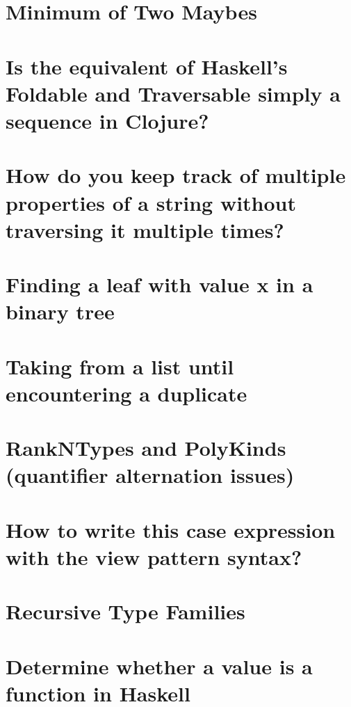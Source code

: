 \documentclass{book}%
\begin{document}
\section{Minimum of Two Maybes}


\section{Is the equivalent of Haskell's Foldable and Traversable simply a sequence in Clojure?}


\section{How do you keep track of multiple properties of a string without traversing it multiple times?}


\section{Finding a leaf with value x in a binary tree}


\section{Taking from a list until encountering a duplicate}


\section{RankNTypes and PolyKinds (quantifier alternation issues)}


\section{How to write this case expression with the view pattern syntax?}


\section{Recursive Type Families}


\section{Determine whether a value is a function in Haskell}

\end{document}
